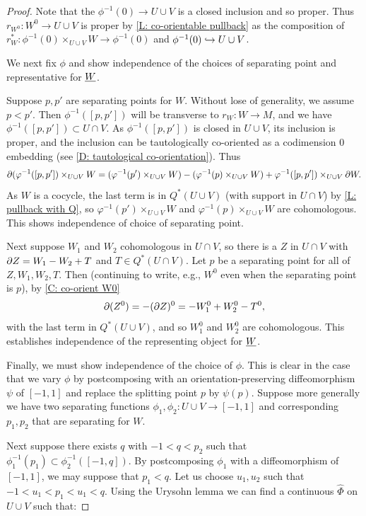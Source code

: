 \begin{proof}
Note that the $\phi^{-1}(0)\to U\cup V$ is a closed inclusion and so proper. Thus $r_{W^0}:W^0\to U\cup V$ is proper by \cref{L: co-orientable pullback} as the composition of $r_W^*:\phi^{-1}(0)\times_{U\cup V}W\to \phi^{-1}(0)$ and $\phi^{-1}(0)\hookrightarrow U\cup V$.


We next fix $\phi$ and show independence of the choices of separating point and representative for $\underline{W}$.

Suppose  $p,p'$  are  separating points for $W$. Without lose of generality, we assume $p<p'$. Then $\phi^{-1}([p,p'])$ will be transverse to $r_W \colon W \to M$, and we have $\phi^{-1}([p,p'])\subset U\cap V$. As $\phi^{-1}([p,p'])$ is closed in $U\cup V$, its inclusion is proper, and the inclusion can be tautologically co-oriented as a codimension $0$ embedding (see \cref{D: tautological co-orientation}).
Thus $$\partial(\varphi^{-1}([p,p'])\times_{U\cup V} W=(\varphi^{-1}(p')\times_{U\cup V} W)-(\varphi^{-1}(p)\times_{U\cup V} W)+ \varphi^{-1}([p,p'])\times_{U\cup V} \partial W.$$ As $W$ is a cocycle, the last term is in $Q^*(U\cup V)$ (with support in $U\cap V$) by \cref{L: pullback with Q}, so $\varphi^{-1}(p')\times_{U\cup V} W$ and $\varphi^{-1}(p)\times_{U\cup V} W$ are cohomologous. This shows independence of choice of separating point.

Next suppose $W_1$ and $W_2$ cohomologous in $U\cap V$, so there is a $Z$ in $U\cap V$ with $\partial Z=W_1-W_2+T$ and $T\in Q^*(U\cap V)$. Let $p$ be a separating point for all of $Z,W_1,W_2,T$. Then (continuing to write, e.g., $W^0$ even when the separating point is $p$), by \cref{C: co-orient W0}  $$\partial (Z^0)=-(\partial Z)^0=-W_1^0+W_2^0-T^0,$$ with the last term in $Q^*(U\cup V)$, and so $W_1^0$ and $W_2^0$ are cohomologous. This establishes independence of the representing object for $\underline{W}$.

Finally, we must show independence of the choice of $\phi$. This is clear in the case that we vary $\phi$ by postcomposing with an orientation-preserving diffeomorphism $\psi$ of $[-1,1]$ and replace the splitting point $p$ by $\psi(p)$.
Suppose more generally we have two separating functions $\phi_1,\phi_2:U\cup V\to [-1,1]$ and corresponding $p_1,p_2$ that are separating for $W$.

Next suppose there exists $q$ with $-1<q<p_2$ such that $\phi_1^{-1}(p_1)\subset \phi_2^{-1}([-1,q])$. By postcomposing $\phi_1$ with a diffeomorphism of $[-1,1]$, we may suppose that $p_1<q$. Let us choose $u_1,u_2$ such that $-1<u_1<p_1<u_1<q$. Using the Urysohn lemma we can find a continuous $\hat \Phi$ on $U\cup V$ such that:


\end{proof}
